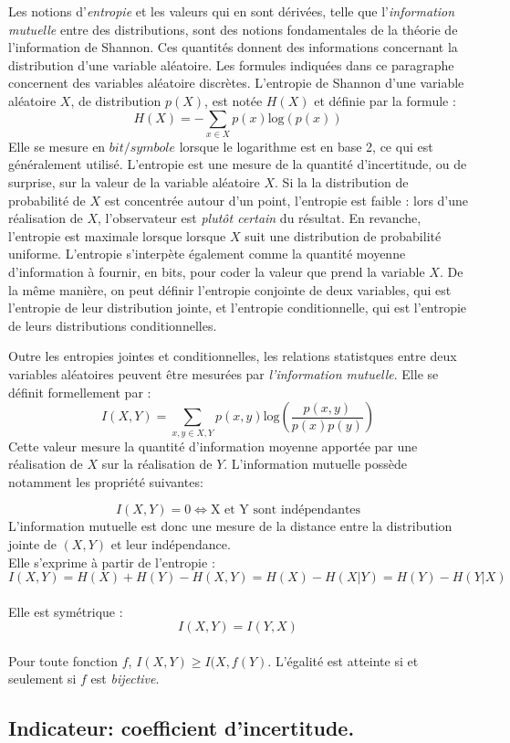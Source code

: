Les notions d'\emph{entropie} et les valeurs qui en sont dérivées, telle que l'\emph{information mutuelle} entre des distributions, sont des notions fondamentales de la théorie de l'information de Shannon. Ces quantités donnent des informations concernant la distribution d'une variable aléatoire.
Les formules indiquées dans ce paragraphe concernent des variables aléatoire discrètes. 
L'entropie de Shannon d'une variable aléatoire $X$, de distribution $p(X)$, est notée $H(X)$ et définie par la formule : 
$$ H(X) = - \sum_{x \in X}{p(x)\textrm{log}(p(x))}$$
Elle se mesure en $bit/symbole$ lorsque le logarithme est en base 2, ce qui est généralement utilisé. 
L'entropie est une mesure de la quantité d'incertitude, ou de surprise, sur la valeur de la variable aléatoire $X$. Si la la distribution de probabilité de $X$ est concentrée autour d'un point, l'entropie est faible : lors d'une réalisation de $X$, l'observateur est \emph{plutôt certain} du résultat. En revanche, l'entropie est maximale lorsque lorsque $X$ suit une distribution de probabilité uniforme.
L'entropie s'interpète également comme la quantité moyenne d'information à fournir, en bits, pour coder la valeur que prend la variable $X$.
De la même manière, on peut définir l'entropie conjointe de deux variables, qui est l'entropie de leur distribution jointe, et l'entropie conditionnelle, qui est l'entropie de leurs distributions conditionnelles.

Outre les entropies jointes et conditionnelles, les relations statistques entre deux variables aléatoires peuvent être mesurées par \emph{l'information mutuelle}. Elle se définit formellement par : 
$$ I(X,Y) = \sum_{x,y \in X,Y}{p(x,y)\textrm{log}(\frac{p(x,y)}{p(x)p(y)})}$$
Cette valeur mesure la quantité d'information moyenne apportée par une réalisation de $X$ sur la réalisation de $Y$. L'information mutuelle possède notamment les propriété suivantes:

$$I(X,Y) = 0 \Leftrightarrow \textrm{X et Y sont indépendantes}$$
L'information mutuelle est donc une mesure de la distance entre la distribution jointe de $(X,Y)$ et leur indépendance.\\
Elle s'exprime à partir de l'entropie : $$I(X,Y) = H(X) + H(Y) - H(X,Y) = H(X) - H(X|Y) = H(Y) - H(Y|X)$$\\
Elle est symétrique : $$I(X,Y) = I(Y,X)$$\\
Pour toute fonction $f$, $I(X,Y) \geq I(X,f(Y)$. L'égalité est atteinte si et seulement si $f$ est \emph{bijective}.

\subsection{Indicateur: coefficient d'incertitude.}

